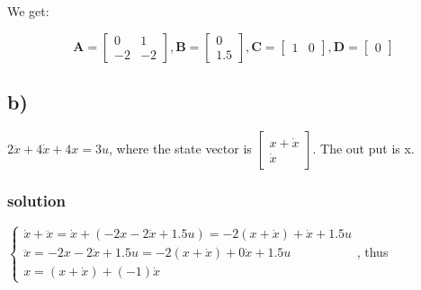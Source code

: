     We get:

    \begin{equation}
        \textbf{A} =
        \begin{bmatrix}
            0 & 1 \\
            -2 & -2
        \end{bmatrix}, 
        \textbf{B} =
        \begin{bmatrix}
            0\\
            1.5
        \end{bmatrix}, 
        \textbf{C} =
        \begin{bmatrix}
            1 & 0
        \end{bmatrix}, 
        \textbf{D} =
        \begin{bmatrix}
            0
        \end{bmatrix}
    \end{equation}

    \subsection{b)} 
    $2\ddot{x} + 4\dot{x} + 4x=3u$, where the state vector is 
    $\begin{bmatrix}
        x + \dot{x} \\
        \dot{x}
    \end{bmatrix}$.
    The out put is x.

    \subsubsection{solution}
    $\left\{
        \begin{array}{lr}
        \dot{x} + \ddot{x} = \dot{x} + (-2x -2\dot{x} + 1.5u) = -2(x + \dot{x}) + \dot{x} + 1.5u\\
        \ddot{x} = -2x -2\dot{x} + 1.5u = -2(x + \dot{x}) + 0\dot{x} + 1.5u \\
        x = (x + \dot{x}) + (-1)\dot{x}
        \end{array}
    \right.$, thus

